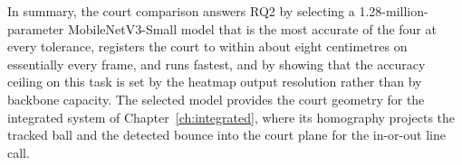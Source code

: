 In summary, the court comparison answers RQ2 by selecting a 1.28-million-parameter
MobileNetV3-Small model that is the most accurate of the four at every tolerance,
registers the court to within about eight centimetres on essentially every frame,
and runs fastest, and by showing that the accuracy ceiling on this task is set by
the heatmap output resolution rather than by backbone capacity. The selected model
provides the court geometry for the integrated system of
Chapter~\ref{ch:integrated}, where its homography projects the tracked ball and
the detected bounce into the court plane for the in-or-out line call.
